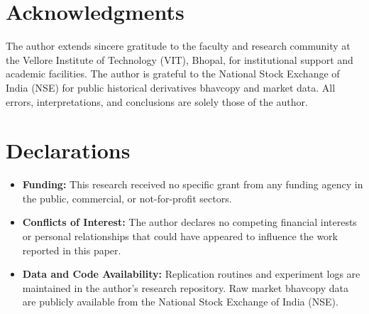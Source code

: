 \documentclass[11pt,a4paper]{article}
\begin{document}
\newpage
\tableofcontents
\newpage









\section*{Acknowledgments}
The author extends sincere gratitude to the faculty and research community at the Vellore Institute of Technology (VIT), Bhopal, for institutional support and academic facilities. The author is grateful to the National Stock Exchange of India (NSE) for public historical derivatives bhavcopy and market data. All errors, interpretations, and conclusions are solely those of the author.

\section*{Declarations}
\begin{itemize}
    \item \textbf{Funding:} This research received no specific grant from any funding agency in the public, commercial, or not-for-profit sectors.
    \item \textbf{Conflicts of Interest:} The author declares no competing financial interests or personal relationships that could have appeared to influence the work reported in this paper.
    \item \textbf{Data and Code Availability:} Replication routines and experiment logs are maintained in the author's research repository. Raw market bhavcopy data are publicly available from the National Stock Exchange of India (NSE).
\end{itemize}



\end{document}
